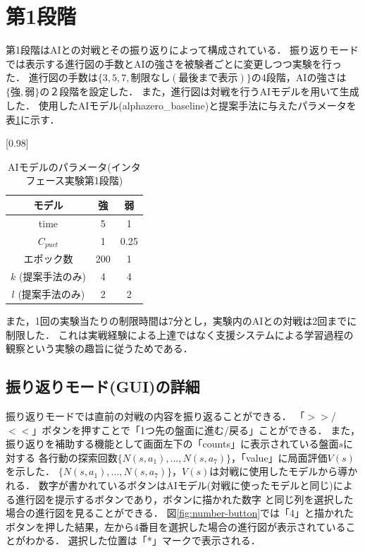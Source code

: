 \section{第1段階}
第1段階はAIとの対戦とその振り返りによって構成されている．
振り返りモードでは表示する進行図の手数とAIの強さを被験者ごとに変更しつつ実験を行った．
進行図の手数は$\{3, 5, 7, 制限なし(最後まで表示)\}$の4段階，AIの強さは$\{強,弱\}$の２段階を設定した．
また，進行図は対戦を行うAIモデルを用いて生成した．
使用したAIモデル(alphazero\_baseline)と提案手法に与えたパラメータを表\ref{table:param-system}に示す．
\begin{table}[H]
	\caption{AIモデルのパラメータ(インタフェース実験第1段階)}
    \label{table:param-system}
	\centering
	\scalebox{0.98}[0.98]{
		\begin{tabular}{c|c|c}
			モデル&強&弱\\\hline
			time    & 5 & 1 \\ 
			$C_{puct}$ & 1   & 0.25 \\
            エポック数 & 200 & 1 \\
			$k$ (提案手法のみ)     & 4 & 4 \\
			$l$ (提案手法のみ)     & 2 & 2 \\

		\end{tabular}
	}
	
\end{table}
また，1回の実験当たりの制限時間は7分とし，実験内のAIとの対戦は2回までに制限した．
これは実戦経験による上達ではなく支援システムによる学習過程の観察という実験の趣旨に従うためである．
\subsection{振り返りモード(GUI)の詳細}
振り返りモードでは直前の対戦の内容を振り返ることができる．
「$>>$/$<<$」ボタンを押すことで「1つ先の盤面に進む/戻る」ことができる．
また，振り返りを補助する機能として画面左下の「counts」に表示されている盤面$s$に対する
各行動の探索回数$\{N(s,a_1), ..., N(s, a_7)\}$，「value」に局面評価$V(s)$を示した．
$\{N(s,a_1), ..., N(s, a_7)\}，V(s)$は対戦に使用したモデルから導かれる．
数字が書かれているボタンはAIモデル(対戦に使ったモデルと同じ)による進行図を提示するボタンであり，ボタンに描かれた数字
と同じ列を選択した場合の進行図を見ることができる．
図\ref{fig:number-button}では「4」と描かれたボタンを押した結果，左から4番目を選択した場合の進行図が表示されていることがわかる．
選択した位置は「*」マークで表示される．



